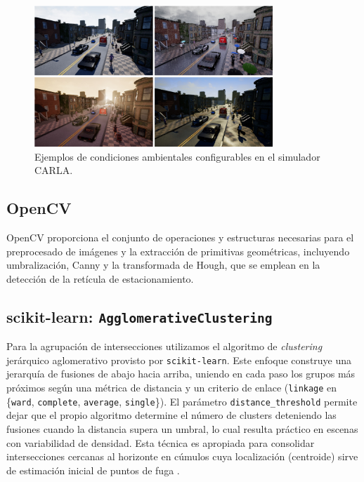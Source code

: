 \begin{figure}[!ht]
	\centering
	\includegraphics[width=0.8\textwidth]{img/carla_clima_example}
	\caption{Ejemplos de condiciones ambientales configurables en el simulador CARLA.}
	\label{fig:carla-simulator-teo}
\end{figure}

\subsection{OpenCV}

OpenCV proporciona el conjunto de operaciones y estructuras necesarias para el preprocesado de imágenes y la extracción de primitivas geométricas, incluyendo umbralización, Canny y la transformada de Hough, que se emplean en la detección de la retícula de estacionamiento.

\subsection{scikit-learn: \texttt{AgglomerativeClustering}}\label{sec:sklearn-agglomerative}

Para la agrupación de intersecciones utilizamos el algoritmo de \emph{clustering} jerárquico aglomerativo provisto por \texttt{scikit-learn}.
Este enfoque construye una jerarquía de fusiones de abajo hacia arriba, uniendo en cada paso los grupos más próximos según
una métrica de distancia y un criterio de enlace (\texttt{linkage} en \{\texttt{ward}, \texttt{complete}, \texttt{average}, \texttt{single}\}).
El parámetro \texttt{distance\_threshold} permite dejar que el propio algoritmo determine el número de clusters deteniendo
las fusiones cuando la distancia supera un umbral, lo cual resulta práctico en escenas con variabilidad de densidad.
Esta técnica es apropiada para consolidar intersecciones cercanas al horizonte en cúmulos cuya localización (centroide)
sirve de estimación inicial de puntos de fuga \cite{tan2005introduction}.


